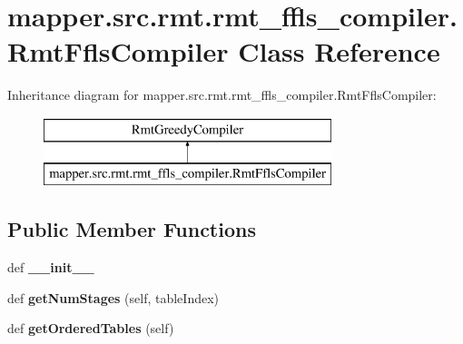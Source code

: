 \hypertarget{classmapper_1_1src_1_1rmt_1_1rmt__ffls__compiler_1_1_rmt_ffls_compiler}{}\section{mapper.\+src.\+rmt.\+rmt\+\_\+ffls\+\_\+compiler.\+Rmt\+Ffls\+Compiler Class Reference}
\label{classmapper_1_1src_1_1rmt_1_1rmt__ffls__compiler_1_1_rmt_ffls_compiler}
Inheritance diagram for mapper.\+src.\+rmt.\+rmt\+\_\+ffls\+\_\+compiler.\+Rmt\+Ffls\+Compiler\+:\begin{figure}[H]
\begin{center}
\leavevmode
\includegraphics[height=2.000000cm]{classmapper_1_1src_1_1rmt_1_1rmt__ffls__compiler_1_1_rmt_ffls_compiler}
\end{center}
\end{figure}
\subsection*{Public Member Functions}
\begin{DoxyCompactItemize}
\item 
\hypertarget{classmapper_1_1src_1_1rmt_1_1rmt__ffls__compiler_1_1_rmt_ffls_compiler_a5aebcf00c693946f8b52bf70e297d556}{}def {\bfseries \+\_\+\+\_\+init\+\_\+\+\_\+}\label{classmapper_1_1src_1_1rmt_1_1rmt__ffls__compiler_1_1_rmt_ffls_compiler_a5aebcf00c693946f8b52bf70e297d556}

\item 
\hypertarget{classmapper_1_1src_1_1rmt_1_1rmt__ffls__compiler_1_1_rmt_ffls_compiler_aa6f9e784da825b5920eb57a615a7e30d}{}def {\bfseries get\+Num\+Stages} (self, table\+Index)\label{classmapper_1_1src_1_1rmt_1_1rmt__ffls__compiler_1_1_rmt_ffls_compiler_aa6f9e784da825b5920eb57a615a7e30d}

\item 
\hypertarget{classmapper_1_1src_1_1rmt_1_1rmt__ffls__compiler_1_1_rmt_ffls_compiler_a88ac523960acfcb462fb4ceaa242516c}{}def {\bfseries get\+Ordered\+Tables} (self)\label{classmapper_1_1src_1_1rmt_1_1rmt__ffls__compiler_1_1_rmt_ffls_compiler_a88ac523960acfcb462fb4ceaa242516c}

\end{DoxyCompactItemize}
